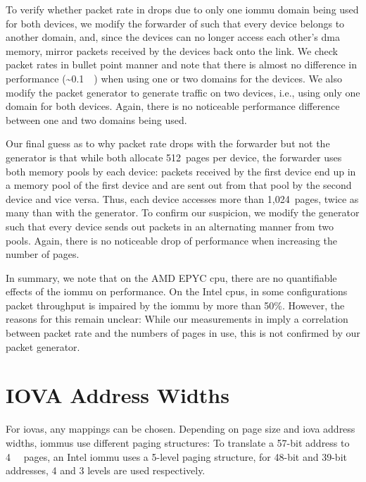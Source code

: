 To verify whether packet rate in  drops due to
only one \ac{iommu} domain being used for both devices, we modify the forwarder
of  such that every device belongs to another
domain, and, since the devices can no longer access each other's \ac{dma}
memory, mirror packets received by the devices back onto the link. We check
packet rates in bullet point manner and note that there is almost no difference
in performance (\textasciitilde \SI{0.1}{\mega\pps}) when using one or two
domains for the devices. We also modify the packet generator
 to generate traffic on two devices, i.e., using
only one domain for both devices. Again, there is no noticeable performance
difference between one and two domains being used.

Our final guess as to why packet rate drops with the forwarder but not the
generator is that while both allocate 512~pages per device, the forwarder uses
both memory pools by each device: packets received by the first device end up in
a memory pool of the first device and are sent out from that pool by the second
device and vice versa. Thus, each device accesses more than 1,024~pages, twice
as many than with the generator. To confirm our suspicion, we modify the
generator such that every device sends out packets in an alternating manner from
two pools. Again, there is no noticeable drop of performance when increasing the
number of pages.

In summary, we note that on the AMD EPYC \ac{cpu}, there are no quantifiable
effects of the \ac{iommu} on performance. On the Intel \acp{cpu}, in some
configurations packet throughput is impaired by the \ac{iommu} by more than
50\%. However, the reasons for this remain unclear: While our measurements in
 imply a correlation between packet rate and the
numbers of pages in use, this is not confirmed by our packet generator.


\section{IOVA Address Widths}
\label{sec:iova_address_widths}

For \acp{iova}, any mappings can be chosen. Depending on page size and \ac{iova}
address widths, \acp{iommu} use different paging structures: To translate a
57-bit address to \SI{4}{\kibi\byte} pages, an Intel \ac{iommu} uses a 5-level
paging structure, for 48-bit and 39-bit addresses, 4 and 3 levels are used
respectively.

